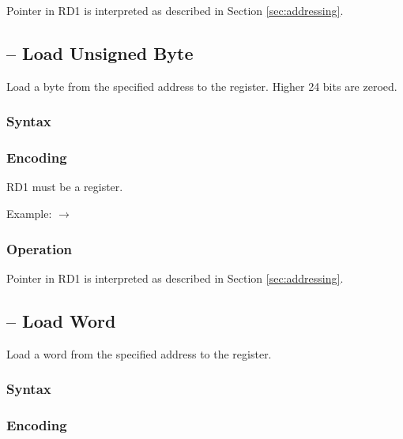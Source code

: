 \documentclass[a4paper,12pt,twoside,extrafontsizes]{memoir}
\begin{document}
{

Pointer in RD1 is interpreted as described in Section \ref{sec:addressing}.

\subsection{ -- Load Unsigned Byte}
\label{subsec:instr:lub}

Load a byte from the specified address to the register. Higher 24 bits are zeroed.

\subsubsection{Syntax}


\subsubsection{Encoding}


RD1 must be a register.

Example:  $\rightarrow$ 

\subsubsection{Operation}


Pointer in RD1 is interpreted as described in Section \ref{sec:addressing}.

\subsection{ -- Load Word}
\label{subsec:instr:lw}

Load a word from the specified address to the register.

\subsubsection{Syntax}


\subsubsection{Encoding}

}
\end{document}
